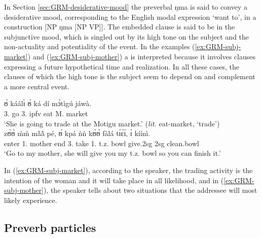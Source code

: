 \begin{exe}
\begin{exe}
\begin{exe}
\begin{exe}
\begin{exe}
\begin{exe}
\begin{exe}
\begin{exe}
\begin{exe}
\begin{exe}
\begin{exe}
In Section \ref{sec:GRM-desiderative-mood} the preverbal {\sls ŋma}  is said to  convey a 
desiderative mood,  corresponding to the English modal expression `want to',  in a construction [NP 
{\sls ŋma} [NP VP]].  The embedded clause is said to be in the subjunctive mood, which is singled 
out by its high tone on the subject  and  the non-actuality and potentiality of the event.  In the examples (\ref{ex:GRM-subj-market}) and (\ref{ex:GRM-subj-mother}) a  
 is interpreted because it involves clauses expressing a future hypothetical time and 
realization. In all these cases, the clauses of which the high tone  is the subject seem to 
depend on and complement a more central event.

\ea
\ea\label{ex:GRM-subj-market}
\gll   ʊ̀ káálɪ̀ ʊ́ ká dí mɔ̀tìgú jáwà.\\
 {3.\sg} go  {3.\sg} {\sc ipfv} eat M. market \\
\glt `She is going to trade at the Motigu market.' ({\it lit.} eat-market,  `trade')\\

 
\ex\label{ex:GRM-subj-mother}
\gll zʊ̀ʊ̀ m̀m̀ mã̀ã̀ pé, ʊ́ kpá ǹǹ kʊ̀ʊ̀ fàlá tɪ́ɛ́ɪ́, ɪ́ kíínì.\\
 enter   {1.\sg} mother end  {3.\sg} take    {1.\sg\poss} t.z. bowl give.{\sc 2sg} {\sc 
2sg} clean.bowl\\
\glt `Go to my mother, she will give you my t.z. bowl so you can finish it.'\\

 \z
 \z
 
 In  (\ref{ex:GRM-subj-market}), according to the speaker, the trading activity is the intention of the woman and it will take place in all likelihood, and in  (\ref{ex:GRM-subj-mother}),  the speaker tells about two situations that the addressee  will most likely experience. 



\subsection{Preverb particles}
\label{sec:GRM-precerv}


\end{exe}
\end{exe}
\end{exe}
\end{exe}
\end{exe}
\end{exe}
\end{exe}
\end{exe}
\end{exe}
\end{exe}
\end{exe}
